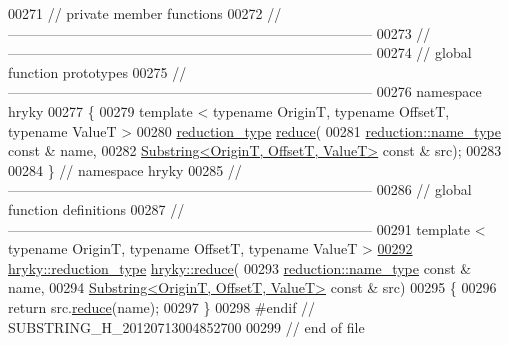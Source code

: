 \begin{DoxyCode}
00271 \textcolor{comment}{// private member functions}
00272 \textcolor{comment}{//
      ------------------------------------------------------------------------------}
00273 \textcolor{comment}{//
      ------------------------------------------------------------------------------}
00274 \textcolor{comment}{// global function prototypes}
00275 \textcolor{comment}{//
      ------------------------------------------------------------------------------}
00276 \textcolor{keyword}{namespace }hryky
00277 \{
00279     \textcolor{keyword}{template} < \textcolor{keyword}{typename} OriginT, \textcolor{keyword}{typename} OffsetT, \textcolor{keyword}{typename} ValueT >
00280     \hyperlink{classhryky_1_1_intrusive_ptr}{reduction_type} \hyperlink{namespacehryky_af41cb3af6766761da0ff21b84527a52c}{reduce}(
00281         \hyperlink{classhryky_1_1reduction_1_1_string}{reduction::name_type} \textcolor{keyword}{const} & name,
00282         \hyperlink{classhryky_1_1_substring}{Substring<OriginT, OffsetT, ValueT>} \textcolor{keyword}{const} & src);
00283 
00284 \} \textcolor{comment}{// namespace hryky}
00285 \textcolor{comment}{//
      ------------------------------------------------------------------------------}
00286 \textcolor{comment}{// global function definitions}
00287 \textcolor{comment}{//
      ------------------------------------------------------------------------------}
00291 \textcolor{comment}{}\textcolor{keyword}{template} < \textcolor{keyword}{typename} OriginT, \textcolor{keyword}{typename} OffsetT, \textcolor{keyword}{typename} ValueT >
\hypertarget{substring_8h_source_l00292}{}\hyperlink{namespacehryky_ade7f6355e1c5f98b8a23c239f26a715d}{00292} \hyperlink{classhryky_1_1_intrusive_ptr}{hryky::reduction_type} \hyperlink{namespacehryky_af41cb3af6766761da0ff21b84527a52c}{hryky::reduce}(
00293     \hyperlink{classhryky_1_1reduction_1_1_string}{reduction::name_type} \textcolor{keyword}{const} & name,
00294     \hyperlink{classhryky_1_1_substring}{Substring<OriginT, OffsetT, ValueT>} \textcolor{keyword}{const} & src)
00295 \{
00296     \textcolor{keywordflow}{return} src.\hyperlink{classhryky_1_1_substring_a816bb8132b58784093f42b812ef8f2ca}{reduce}(name);
00297 \}
00298 \textcolor{preprocessor}{#endif // SUBSTRING\_H\_20120713004852700}
00299 \textcolor{preprocessor}{}\textcolor{comment}{// end of file}
\end{DoxyCode}
